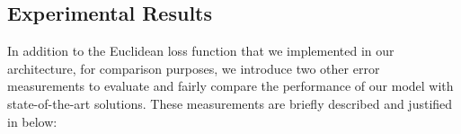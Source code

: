  



\subsection{Experimental Results}
In addition to the Euclidean loss function that we implemented in our architecture, for comparison purposes, we introduce two other error measurements to evaluate and fairly compare the performance of our model with state-of-the-art solutions. These measurements are briefly described and justified in below:
